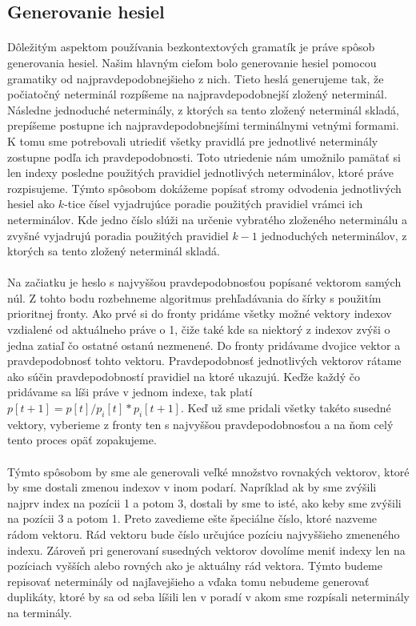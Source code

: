 \subsection{Generovanie hesiel}
\paragraph{}
Dôležitým aspektom používania bezkontextových gramatík je práve spôsob generovania hesiel. Našim hlavným cieľom bolo generovanie hesiel pomocou gramatiky od najpravdepodobnejšieho z nich. Tieto heslá generujeme tak, že počiatočný neterminál rozpíšeme na najpravdepodobnejší zložený neterminál. Následne jednoduché neterminály, z ktorých sa tento zložený neterminál skladá, prepíšeme postupne ich najpravdepodobnejšími terminálnymi vetnými formami. K tomu sme potrebovali utriediť všetky pravidlá pre jednotlivé neterminály zostupne podľa ich pravdepodobnosti. Toto utriedenie nám umožnilo pamätať si len indexy posledne použitých pravidiel jednotlivých neterminálov, ktoré práve rozpisujeme. Týmto spôsobom dokážeme popísať stromy odvodenia jednotlivých hesiel ako \(k\)-tice čísel vyjadrujúce poradie použitých pravidiel vrámci ich neterminálov. Kde jedno číslo slúži na určenie vybratého zloženého neterminálu a zvyšné vyjadrujú poradia použitých pravidiel \(k-1\) jednoduchých neterminálov, z ktorých sa tento zložený neterminál skladá.
\paragraph{}
Na začiatku je heslo s najvyššou pravdepodobnosťou popísané vektorom samých núl. Z tohto bodu rozbehneme algoritmus prehľadávania do šírky s použitím prioritnej fronty. Ako prvé si do fronty pridáme všetky možné vektory indexov vzdialené od aktuálneho práve o 1, čiže také kde sa niektorý z indexov zvýši o jedna zatiaľ čo ostatné ostanú nezmenené. Do fronty pridávame dvojice vektor a pravdepodobnosť tohto vektoru. Pravdepodobnosť jednotlivých vektorov rátame ako súčin pravdepodobností pravidiel na ktoré ukazujú. Keďže každý čo pridávame sa líši práve v jednom indexe, tak platí \(p[t+1] = p[t] / p_i[t] * p_i[t+1]\). Keď už sme pridali všetky takéto susedné vektory, vyberieme z fronty ten s najvyššou pravdepodobnosťou a na ňom celý tento proces opäť zopakujeme.
\paragraph{}
Týmto spôsobom by sme ale generovali veľké množstvo rovnakých vektorov, ktoré by sme dostali zmenou indexov v inom podarí. Napríklad ak by sme zvýšili najprv index na pozícii 1 a potom 3, dostali by sme to isté, ako keby sme zvýšili na pozícii 3 a potom 1. Preto zavedieme ešte špeciálne číslo, ktoré nazveme rádom vektoru. Rád vektoru bude číslo určujúce pozíciu najvyššieho zmeneného indexu. Zároveň pri generovaní susedných vektorov dovolíme meniť indexy len na pozíciach vyšších alebo rovných ako je aktuálny rád vektora. Týmto budeme repisovať neterminály od najľavejšieho a vďaka tomu nebudeme generovať duplikáty, ktoré by sa od seba líšili len v poradí v akom sme rozpísali neterminály na terminály.

